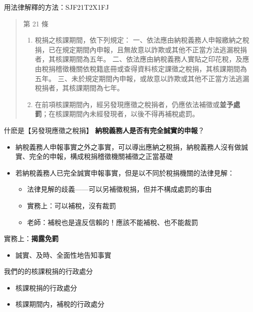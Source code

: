 \documentclass[]{ctexbook}
\providecommand{\tightlist}{%
  \setlength{\itemsep}{0pt}\setlength{\parskip}{0pt}}
\begin{document}
用法律解釋的方法：SJF21T2X1FJ

\begin{quote}
第 21 條

\begin{enumerate}
\def\labelenumi{\arabic{enumi}.}
\tightlist
\item
  稅捐之核課期間，依下列規定：
  一、依法應由納稅義務人申報繳納之稅捐，已在規定期間內申報，且無故意以詐欺或其他不正當方法逃漏稅捐者，其核課期間為五年。
  二、依法應由納稅義務人實貼之印花稅，及應由稅捐稽徵機關依稅籍底冊或查得資料核定課徵之稅捐，其核課期間為五年。
  三、未於規定期間內申報，或故意以詐欺或其他不正當方法逃漏稅捐者，其核課期間為七年。
\item
  在前項核課期間內，經另發現應徵之稅捐者，仍應依法補徵或\textbf{並予處罰}；在核課期間內未經發現者，以後不得再補稅處罰。
\end{enumerate}
\end{quote}

什麽是【另發現應徵之稅捐】
\textbf{納稅義務人是否有完全誠實的申報}？

\begin{itemize}
\tightlist
\item
  納稅義務人申報事實之外之事實，可以導出應納之稅捐，納稅義務人沒有做誠實、完全的申報，構成稅捐稽徵機關補徵之正當基礎
\item
  若納稅義務人已完全誠實申報事實，但是以不同於稅捐機關的法律見解：

  \begin{itemize}
  \tightlist
  \item
    法律見解的歧義------可以另補徵稅捐，但并不構成處罰的事由
  \item
    實務上：可以補稅，沒有裁罰
  \item
    老師：補稅也是違反信賴的！應該不能補稅、也不能裁罰
  \end{itemize}
\end{itemize}

實務上：\textbf{揭露免罰}

\begin{itemize}
\tightlist
\item
  誠實、及時、全面性地告知事實
\end{itemize}

我們的的核課稅捐的行政處分

\begin{itemize}
\tightlist
\item
  核課稅捐的行政處分
\item
  核課期間内，補稅的行政處分
\end{itemize}
\end{document}
